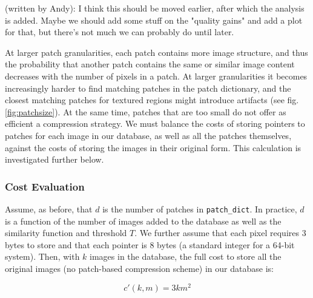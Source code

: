 
\begin{edit}
(written by Andy): I think this should be moved earlier, after which the analysis is added.  Maybe we should add some stuff on the "quality gains" and add a plot for that, but there's not much we can probably do until later.
\end{edit}

At larger patch granularities, each patch contains more image structure, and thus the probability that another patch contains the same or similar image content decreases with the number of pixels in a patch. At larger granularities it becomes increasingly harder to find matching patches in the patch dictionary, and the closest matching patches for textured regions might introduce artifacts (see fig.\ref{fig:patchsize}). At the same time, patches that are too small do not offer as efficient a compression strategy. We must balance the costs of storing pointers to patches for each image in our database, as well as all the patches themselves, against the costs of storing the images in their original form. This calculation is investigated further below. 


\subsubsection{Cost Evaluation}
\label{sec:costeval}

Assume, as before, that $d$ is the number of patches in \texttt{patch\_dict}.  In practice, $d$ is a function of the number of images added to the database as well as the similarity function and threshold $T$.  We further assume that each pixel requires 3 bytes to store and that each pointer is 8 bytes (a standard integer for a 64-bit system).  Then, with $k$ images in the database, the full cost to store all the original images (no patch-based compression scheme) in our database is:

\begin{equation}
	 c'(k, m) = 3  k  m^2
\end{equation}

